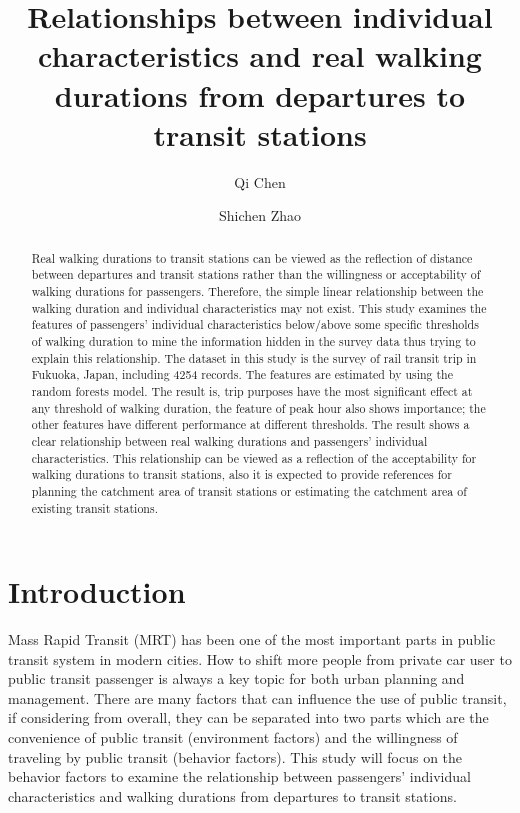 \documentclass[Journal,letterpaper]{ascelike-new}
\begin{document}
\title{Relationships between individual characteristics and real walking durations from departures to transit stations}
%
\author[1]{Qi Chen}
\author[2]{Shichen Zhao}
%
%
\maketitle

\begin{abstract}
Real walking durations to transit stations can be viewed as the reflection of distance between departures and transit stations rather than the willingness or acceptability of walking durations for passengers. Therefore, the simple linear relationship between the walking duration and individual characteristics may not exist. This study examines the features of passengers' individual characteristics below/above some specific thresholds of walking duration to mine the information hidden in the survey data thus trying to explain this relationship. The dataset in this study is the survey of rail transit trip in Fukuoka, Japan, including 4254 records. The features are estimated by using the random forests model. The result is, trip purposes have the most significant effect at any threshold of walking duration, the feature of peak hour also shows importance; the other features have different performance at different thresholds. The result shows a clear relationship between real walking durations and passengers' individual characteristics. This relationship can be viewed as a reflection of the acceptability for walking durations to transit stations, also it is expected to provide references for planning the catchment area of transit stations or estimating the catchment area of existing transit stations.
\end{abstract}

%
\section{Introduction}
Mass Rapid Transit (MRT) has been one of the most important parts in public transit system in modern cities. How to shift more people from private car user to public transit passenger is always a key topic for both urban planning and management. There are many factors that can influence the use of public transit, if considering from overall, they can be separated into two parts which are the convenience of public transit (environment factors) and the willingness of traveling by public transit (behavior factors). This study will focus on the behavior factors to examine the relationship between passengers' individual characteristics and walking durations from departures to transit stations.
\end{document}
